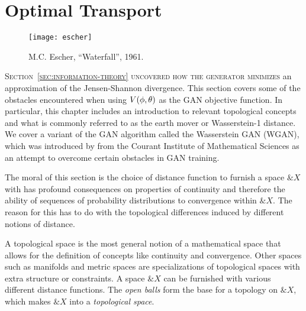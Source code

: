 \section{Optimal Transport}
\label{sec:optimal-transport}

\vspace{1cm}

\begin{figure}[h]
  \label{fig:paradise} \centering
   {
    \texttt{[image: escher]}
  }
  \caption{M.C. Escher, ``Waterfall'', 1961.}
\end{figure}

\vspace{1cm}

\lettrine[lines=3]{\Royal S}{ection~\ref{sec:information-theory}
  uncovered how the generator minimizes} an approximation of the
Jensen-Shannon divergence. This section covers some of the obstacles
encountered when using $V(\phi, \theta)$ as the GAN objective function. In
particular, this chapter includes an introduction to relevant
topological concepts and what is commonly referred to as the earth
mover or Wasserstein-1 distance.  We cover a variant of the GAN
algorithm called the Wasserstein GAN (WGAN), which was introduced by
\cite{ref:arjovsky-2017} from the Courant Institute of Mathematical
Sciences as an attempt to overcome certain obstacles in GAN training.

The moral of this section is the choice of distance function to
furnish a space $\&X$ with has profound consequences on properties of
continuity and therefore the ability of sequences of probability
distributions to convergence within $\&X$.  The reason for this has to
do with the topological differences induced by different notions of
distance.

A topological space is the most general notion of a mathematical space
that allows for the definition of concepts like continuity and
convergence.  Other spaces such as manifolds and metric spaces are
specializations of topological spaces with extra structure or
constraints.  A space $\&X$ can be furnished with various different
distance functions.  The \textit{open balls} form the base for a
topology on $\&X$, which makes $\&X$ into a \textit{topological
  space}.


